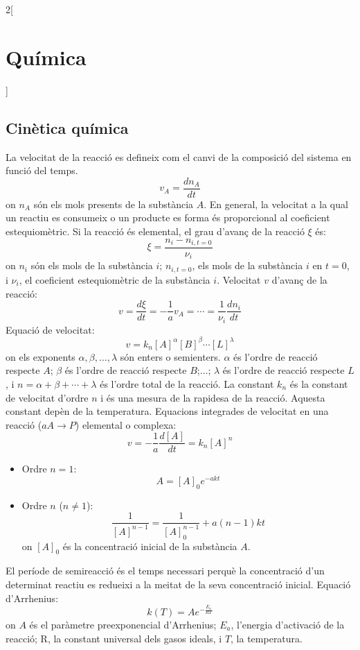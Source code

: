 \documentclass[class=article,10pt,crop=false]{standalone}
\begin{document}
\begin{multicols}{2}[\section{Química}]
\subsection{Cinètica química}
La velocitat de la reacció es defineix com el canvi de la
composició del sistema en funció del temps. $$v_A=\frac{dn_A}{dt}$$ {\footnotesize on $n_A$ són els mols presents de la substància $A$.}
En general, la velocitat a la qual un reactiu es consumeix o un producte es forma és proporcional al coeficient estequiomètric.\newline
Si la reacció és elemental, el grau d'avanç de la reacció $\xi$ és: $$\xi=\frac{n_i-n_{i,t=0}}{\nu_i}$$ {\footnotesize on $n_i$ són els mols de la substància $i$; $n_{i,t=0}$, els mols de la substància $i$ en $t=0$, i $\nu_i$, el coeficient estequiomètric de la substància $i$.}\newline
Velocitat $v$ d'avanç de la reacció: $$v=\frac{d\xi}{dt}=-\frac{1}{a}v_A=\cdots=\frac{1}{\nu_i}\frac{dn_i}{dt}$$
Equació de velocitat: $$v=k_n[A]^\alpha[B]^\beta\cdots[L]^\lambda$$ {\footnotesize on els exponents $\alpha,\beta,\ldots,\lambda$ són enters o semienters. $\alpha$ és l'ordre de reacció respecte $A$; $\beta$ és l'ordre de reacció res\-pec\-te $B$;$\ldots$; $\lambda$ és l'ordre de reacció res\-pec\-te $L$, i $n=\alpha+\beta+\cdots+\lambda$ és l'ordre total de la reacció. La constant $k_n$ és la constant de ve\-lo\-ci\-tat d’ordre $n$ i és una mesura de la rapidesa de la reacció. Aquesta constant depèn de la temperatura.}\newline
Equacions integrades de velocitat en una reacció ($aA\rightarrow P$) elemental o complexa: $$v=-\frac{1}{a}\frac{d[A]}{dt}=k_n[A]^n$$
\begin{itemize}
    \item Ordre $n=1$: $$A=[A]_0e^{-akt}$$
    \item Ordre $n$ ($n\ne1$): $$\frac{1}{[A]^{n-1}}=\frac{1}{[A]^{n-1}_0}+a(n-1)kt$$
{\footnotesize on $[A]_0$ és la concentració inicial de la substància $A$.}
\end{itemize}
El període de semireacció és el temps necessari perquè la
concentració d’un determinat reactiu es redueixi a la meitat de la seva concentració inicial.\newline
Equació d'Arrhenius: $$k(T)=Ae^{-\frac{E_a}{RT}}$$ {\footnotesize on $A$ és el paràmetre preexponencial d'Arrhenius; $E_a$, l'energia d'activació de la reacció; R, la cons\-tant universal dels gasos ideals, i $T$, la tem\-pe\-ra\-tu\-ra.}

\end{multicols}
\end{document}
